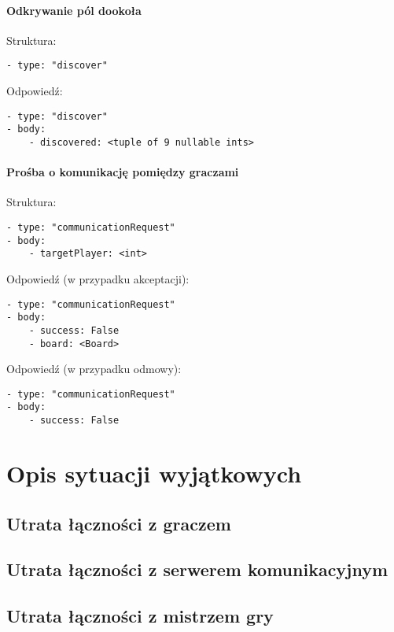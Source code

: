 \documentclass[a4paper]{article}
\begin{document}
\paragraph{Odkrywanie pól dookoła}
\hfill

Struktura:

\begin{verbatim}
- type: "discover"
\end{verbatim}

Odpowiedź:

\begin{verbatim}
- type: "discover"
- body:
    - discovered: <tuple of 9 nullable ints>
\end{verbatim}

\paragraph{Prośba o komunikację pomiędzy graczami}
\hfill

Struktura:

\begin{verbatim}
- type: "communicationRequest"
- body:
    - targetPlayer: <int>
\end{verbatim}

Odpowiedź (w przypadku akceptacji):

\begin{verbatim}
- type: "communicationRequest"
- body:
    - success: False
    - board: <Board>
\end{verbatim}

Odpowiedź (w przypadku odmowy):

\begin{verbatim}
- type: "communicationRequest"
- body:
    - success: False
\end{verbatim}

\section{Opis sytuacji wyjątkowych}

\subsection{Utrata łączności z graczem}

\subsection{Utrata łączności z serwerem komunikacyjnym}

\subsection{Utrata łączności z mistrzem gry}
\end{document}
